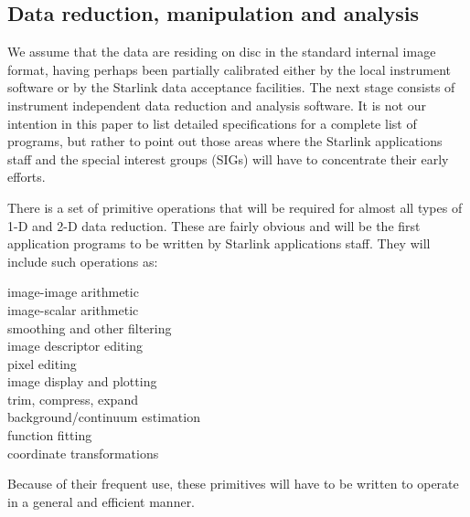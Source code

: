 \subsection {Data reduction, manipulation and analysis}
We assume that the data are residing on disc in the standard internal image
format, having perhaps been partially calibrated either by the local instrument
software or by the Starlink data acceptance facilities.
The next stage consists of instrument independent data reduction and analysis
software.
It is not our intention in this paper to list detailed specifications for a
complete list of programs, but rather to point out those areas where the
Starlink applications staff and the special interest groups (SIGs) will have to
concentrate their early efforts.

There is a set of primitive operations that will be required for almost all
types of 1-D and 2-D data reduction.
These are fairly obvious and will be the first application programs to be
written by Starlink applications staff.
They will include such operations as:
\begin{description}
\begin{description}
\item [image-image arithmetic]
\item [image-scalar arithmetic]
\item [smoothing and other filtering]
\item [image descriptor editing]
\item [pixel editing]
\item [image display and plotting]
\item [trim, compress, expand]
\item [background/continuum estimation]
\item [function fitting]
\item [coordinate transformations]
\end{description}
\end{description}
Because of their frequent use, these primitives will have to be written to
operate in a general and efficient manner.

